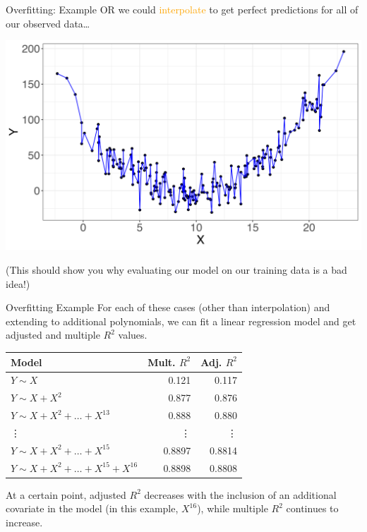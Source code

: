 \documentclass[10pt,t]{beamer}
\begin{document}
\begin{frame}{Overfitting: Example}
OR we could \textcolor{orange}{interpolate} to get perfect predictions for all of our observed data\dots

\vspace{0.3cm}

\begin{center}
	 \includegraphics[scale=0.4]{figures/overfit5.png}
\end{center}
\begin{footnotesize}
	\vspace{-0.1cm}
(This should show you why evaluating our model on our training data is a bad idea!)
\end{footnotesize}
\end{frame}

\begin{frame}{Overfitting Example}
For each of these cases (other than interpolation) and extending to additional polynomials, we can fit a linear regression model and get adjusted and multiple $R^2$ values.

\vspace{0.3cm}

\begin{table}
	\begin{tabular}{l|r|r}

Model & Mult. $R^2$ & Adj. $R^2$ \\
\hline
$Y \sim X$ & 0.121 & 0.117\\
\hline
$Y \sim X + X^2$ & 0.877 & 0.876\\
\hline
$Y \sim X + X^2 + \dots + X^{13}$ & 0.888 & 0.880 \\
\hline
\vdots & \vdots & \vdots \\
\hline
$Y \sim X + X^2 + \dots + X^{15}$ & 0.8897 & 0.8814 \\
\hline
$Y \sim X + X^2 + \dots + X^{15} + X^{16}$ & 0.8898 & 0.8808
\end{tabular}
\end{table}

\vspace{0.3cm} At a certain point, adjusted $R^2$ decreases with the inclusion of an additional covariate in the model (in this example, $X^{16}$), while multiple $R^2$ continues to increase.
	
\end{frame}
\end{document}
